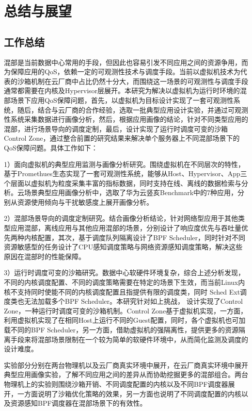 \chapter{总结与展望}\label{chap:theories_tech}

\section{工作总结}

混部是当前数据中心常用的手段，但因此也容易引发不同应用之间的资源争用，而为保障应用的QoS，依赖一定的可观测性技术与调度手段。当前以虚拟机技术为代表的沙箱机制在云厂商中占比仍然十分大，而围绕这一场景的可观测性与调度手段通常都需要在内核及Hypervisor层展开。本研究为解决以虚拟机为运行时环境的混部场景下应用QoS保障问题，首先，以虚拟机为目标设计实现了一套可观测性系统，随后，结合与云厂商的合作经验，选取一批典型应用设计实验，并通过可观测性系统采集数据进行画像分析，然后，根据应用画像的结论，针对不同类型应用的混部，进行场景导向的调度定制，最后，设计实现了运行时调度可变的沙箱Control Zone，通过整合前置的研究结果来解决单个服务器上不同混部场景下的QoS保障问题。具体工作如下：

1）面向虚拟机的典型应用监测与画像分析研究。围绕虚拟机在不同层次的特性，基于Promethues生态实现了一套可观测性系统，能够从Host、Hypervisor、App三个层面以虚拟机为粒度采集丰富的指标数据，同时支持在线、离线的数据检索与分析。云场景典型应用画像分析中，选取了华为云竖亥Benchmark中的7种应用，分别从资源使用倾向与干扰敏感度上展开画像分析。

2）混部场景导向的调度定制研究。结合画像分析结论，针对网络型应用于其他类型应用混部，离线应用与其他应用混部的场景，分别设计了响应度优先与吞吐量优先两种内核配置，其次，基于调度队列隔离设计了BPF Scheduler，同时针对不同资源敏感型的任务设计了CPU感知调度策略与网络资源感知调度策略，解决这些原因在混部时的性能保障。

3）运行时调度可变的沙箱研究。数据中心软硬件环境复杂，综合上述分析发现，不同的内核调度配置、不同的调度策略需要在特定的场景下生效，而当前Linux内核不支持同时使能不同的内核调度配置且指提供有限的调度类，同时 Sched Ext调度类也无法加载多个BPF Scheduler。本研究针对如上挑战， 设计实现了Control Zone，一种运行时调度可变的沙箱机制。Control Zone基于虚拟机实现，一方面，利用虚拟机实现了在相同Host上运行不同的Guest配置，同时，各个虚拟机也可加载不同的BPF Scheduler，另一方面，借助虚拟机的强隔离性，提供更多的资源隔离手段来将混部场景限制在一个较为简单的软硬件环境中，从而简化监测及调度的设计难度。

实验部分分别在两台物理机以及云厂商真实环境中展开，在云厂商真实环境中展开典型应用画像实验，了解不同应用之间的差异从而协助挖掘更多的混部组合。两台物理机上的实验则围绕沙箱开销、不同调度配置的内核以及不同BPF调度器展开，一方面说明了沙箱优化策略的效果，另一方面也说明了不同调度配置的内核以及资源感知BPF调度器在混部场景下的有效性。

